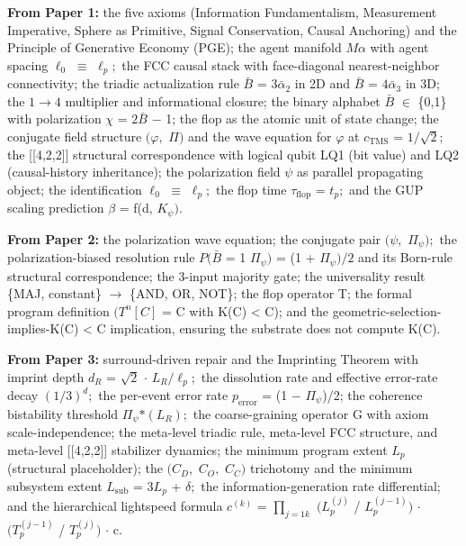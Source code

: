 \documentclass[11pt,oneside]{report}
\theoremstyle{definition}
\theoremstyle{remark}
\begin{document}
\textbf{From Paper 1:} the five axioms (Information Fundamentalism,
Measurement Imperative, Sphere as Primitive, Signal Conservation, Causal
Anchoring) and the Principle of Generative Economy (PGE); the agent
manifold \ensuremath{M\alpha} with agent spacing \ensuremath{\ell_{0}} \ensuremath{\equiv} \ensuremath{\ell_{p};} the FCC causal stack with
face-diagonal nearest-neighbor connectivity; the triadic actualization
rule \ensuremath{\bar{B}} = \ensuremath{3\bar{\alpha}_{2}} in 2D and \ensuremath{\bar{B}} = \ensuremath{4\bar{\alpha}_{3}} in 3D; the \ensuremath{1\to 4} multiplier and
informational closure; the binary alphabet \ensuremath{\bar{B}} \ensuremath{\in} \{0,1\} with polarization
\ensuremath{\chi} = \ensuremath{2\bar{B}} \ensuremath{-} 1; the flop as the atomic unit of state change; the conjugate
field structure \ensuremath{(\varphi ,} \ensuremath{\Pi )} and the wave equation for \ensuremath{\varphi} at \ensuremath{c_{\mathrm{TMS}}} = \ensuremath{1/\sqrt{2};} the
[[4,2,2]] structural correspondence with logical qubit LQ1 (bit
value) and LQ2 (causal-history inheritance); the polarization field \ensuremath{\psi} as
parallel propagating object; the identification \ensuremath{\ell_{0}} \ensuremath{\equiv} \ensuremath{\ell_{p};} the flop time
\ensuremath{\tau_{\mathrm{flop}}} = \ensuremath{t_{p};} and the GUP scaling prediction \ensuremath{\beta} = f(d, \ensuremath{K_{\psi}).}

\textbf{From Paper 2:} the polarization wave equation; the conjugate
pair \ensuremath{(\psi ,} \ensuremath{\Pi_{\psi});} the polarization-biased resolution rule \ensuremath{P(\bar{B}} = 1
\textbar{} \ensuremath{\Pi_{\psi})} = (1 + \ensuremath{\Pi_{\psi})/2} and its Born-rule structural
correspondence; the 3-input majority gate; the universality result
\{MAJ, constant\} \ensuremath{\to} \{AND, OR, NOT\}; the flop operator T; the formal
program definition \ensuremath{(T^{n}[C]} = C with K(C) \textless{}
\textbar C\textbar); and the geometric-selection-implies-K(C)
\textless{} \textbar C\textbar{} implication, ensuring the substrate
does not compute K(C).

\textbf{From Paper 3:} surround-driven repair and the Imprinting Theorem
with imprint depth \ensuremath{d_{R}} = \ensuremath{\sqrt{2}} \ensuremath{\cdot} \ensuremath{L_{R}/\ell_{p};} the dissolution rate and
effective error-rate decay \ensuremath{(1/3)^{d};} the per-event error rate \ensuremath{p_{\mathrm{error}}}
= (1 \ensuremath{-} \textbar \ensuremath{\Pi_{\psi}}\textbar)/2; the coherence bistability threshold
\textbar \ensuremath{\Pi_{\psi}}\textbar\ensuremath{*(L_{R});} the coarse-graining operator G with axiom
scale-independence; the meta-level triadic rule, meta-level FCC
structure, and meta-level [[4,2,2]] stabilizer dynamics; the
minimum program extent \ensuremath{L_{p}} (structural placeholder); the \ensuremath{(C_{D},} \ensuremath{C_{O},}
\ensuremath{C_{C})} trichotomy and the minimum subsystem extent \ensuremath{L_{\mathrm{sub}}} = \ensuremath{3L_{p}} + \ensuremath{\delta ;}
the information-generation rate differential; and the hierarchical
lightspeed formula \ensuremath{c^{(k)}} = \ensuremath{\prod _{j=1k}} \ensuremath{(L_{p}^{(j)}} / \ensuremath{L_{p}^{(j-1)})} \ensuremath{\cdot}
\ensuremath{(T_{p}^{(j-1)}} / \ensuremath{T_{p}^{(j)})} \ensuremath{\cdot} c.
\end{document}
